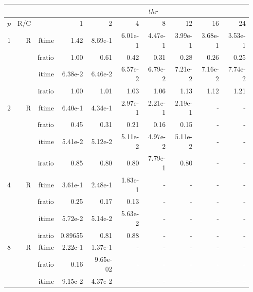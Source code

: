 \documentclass[a4paper]{article}
\begin{document}
\begin{table}[htbp]
\begin{center}
\begin{small}
\begin{tabular}{|r|r|r|r|r|r|r|r|r|r|}
\hline 
     & & & \multicolumn{7}{c|}{$thr$} \\ \hline
    $p$ & R/C &  & 1           & 2    & 4    & 8    & 12   & 16    & 24  \\ \hline\hline
   1 &  R &   ftime &    1.42  &    8.69e-1 &    6.01e-1 &    4.47e-1 &    3.99e-1 &    3.68e-1 &    3.53e-1 \\
             &             &  fratio &    1.00 &    0.61 &    0.42 &    0.31 &    0.28 &    0.26 &    0.25 \\
             &             &  itime &    6.38e-2 &    6.46e-2 &    6.57e-2 &    6.79e-2 &    7.21e-2 &    7.16e-2 &    7.74e-2 \\
             &             &  iratio &    1.00 &    1.01  &    1.03  &    1.06  &    1.13  &    1.12  &    1.21  \\\hline
   2 &  R &   ftime &    6.40e-1 &    4.34e-1 &    2.97e-1 &    2.21e-1 &    2.19e-1 &      - &      - \\
             &             &  fratio &    0.45 &   0.31 &   0.21 &    0.16 &    0.15 &      - &      - \\
             &             &  itime &    5.41e-2 &    5.12e-2 &    5.11e-2 &    4.97e-2 &    5.11e-2 &      - &      - \\
             &             &  iratio &    0.85 &    0.80 &    0.80 &    7.79e-1 &    0.80 &      - &      - \\\hline
   4 &  R &   ftime &    3.61e-1 &    2.48e-1 &    1.83e-1 &      - &      - &      - &      - \\
             &             &  fratio &    0.25 &    0.17 &    0.13 &      - &      - &      - &      - \\
             &             &  itime &    5.72e-2 &    5.14e-2 &    5.63e-2 &      - &      - &      - &      - \\
             &             &  iratio &    0.89655 &   0.81 &    0.88 &      - &      - &      - &      - \\\hline
   8 &   R &   ftime &    2.22e-1 &    1.37e-1 &      - &      - &      - &      - &      - \\
             &             &  fratio &    0.16 &   9.65e-02 &     - &      - &      - &      - &      - \\
             &             &  itime &    9.15e-2 &    4.37e-2 &      - &      - &      - &      - &      - \\

\end{tabular}
\end{small}
\end{center}
\end{table}
\end{document}
